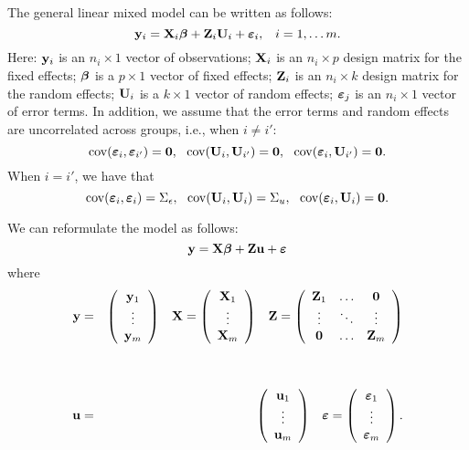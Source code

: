 The general linear mixed model can be written as follows:
$$
\mathbf{y}_i = \mathbf{X}_i \mbox{\boldmath $\beta$} + \mathbf{Z}_i \mathbf{U}_i + \mbox{\boldmath $\varepsilon$}_i, \, \, \, \, \,  i=1,\ldots m. 
$$
Here:
$\mathbf{y}_i$ is an $n_i \times 1$ vector of observations;
 $\mathbf{X}_i$ is an $n_i \times p$ design matrix for the fixed effects;
$\mbox{\boldmath $\beta$}$ is a $p \times 1$ vector of fixed effects;
$\mathbf{Z}_i$ is an $n_i \times k$ design matrix for the random effects;
$\mathbf{U}_i$ is a $k \times 1$ vector of random effects;
$\mbox{\boldmath $\varepsilon$}_j$ is an $n_i \times 1$ vector of error terms.
In addition, we assume that the error terms and random effects are uncorrelated across groups, i.e., when $i \ne i'$:
$$\mathrm{cov}(\mbox{\boldmath $\varepsilon$}_i, \mbox{\boldmath $\varepsilon$}_{i'}) = \mathbf{0}, \,\,\,\, \mathrm{cov}(\mathbf{U}_i, \mathbf{U}_{i'}) = \mathbf{0},  \,\,\,\,    \mathrm{cov}(\mbox{\boldmath $\varepsilon$}_i, \mathbf{U}_{i'}) = \mathbf{0}.$$
When $i = i'$, we have that 
$$\mathrm{cov}(\mbox{\boldmath $\varepsilon$}_i, \mbox{\boldmath $\varepsilon$}_{i}) = \Sigma_\epsilon, \,\,\,\, \mathrm{cov}(\mathbf{U}_i, \mathbf{U}_{i}) = \Sigma_u,  \,\,\,\,    \mathrm{cov}(\mbox{\boldmath $\varepsilon$}_i, \mathbf{U}_{i}) = \mathbf{0}.$$

We can reformulate the model as follows:
$$
\mathbf{y} = \mathbf{X} \mbox{\boldmath $\beta$} + \mathbf{Z} \mathbf{u} + \mbox{\boldmath $\varepsilon$}
$$
where
\begin{eqnarray*}
\mathbf{y} &=& \left( \begin{array}{c} \mathbf{y}_{1} \\ \vdots \\ \mathbf{y}_{m}  \end{array} \right) \,\,\,\,\,
\mathbf{X}  = \left( \begin{array}{c} \mathbf{X}_{1} \\ \vdots \\ \mathbf{X}_{m}  \end{array} \right) \,\,\,\,\,
\mathbf{Z}  = \left( \begin{array}{ccc}   \mathbf{Z}_{1} & \ldots & \mathbf{0} \\ \vdots  & \ddots & \vdots \\ \mathbf{0} &\ldots &   \mathbf{Z}_{m}  \end{array} \right) \\
\\ 
\\
\mathbf{u}  &=& \left( \begin{array}{c} \mathbf{u}_1 \\ \vdots \\ \mathbf{u}_{m}  \end{array} \right) \,\,\,\,\,
\mbox{\boldmath $\varepsilon$}  = \left( \begin{array}{c} \mbox{\boldmath $\varepsilon$}_1 \\ \vdots \\ \mbox{\boldmath $\varepsilon$}_{m}  \end{array} \right) .
\end{eqnarray*}

